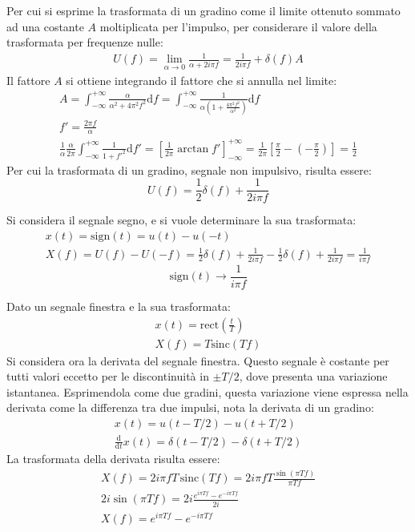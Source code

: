 \documentclass{article}
\newcommand{\rect}{\mathrm{rect}}
\newcommand{\sinc}{\mathrm{sinc}}
\newcommand{\df}{\mathrm{d}}
\numberwithin{equation}{subsection}
\begin{document}
Per cui si esprime la trasformata di un gradino come il limite ottenuto sommato ad una costante $A$ moltiplicata per l'impulso, per considerare il valore della trasformata 
per frequenze nulle: 
\begin{gather*}
    U(f)=\displaystyle\lim_{\alpha\to0}\frac{1}{\alpha+2i\pi f}=\frac{1}{2i\pi f}+\delta(f)A
\end{gather*}
Il fattore $A$ si ottiene integrando il fattore che si annulla nel limite:
\begin{gather*}
    A=\displaystyle\int_{-\infty}^{+\infty}\frac{\alpha}{\alpha^2+4\pi^2f^2}\df f=\int_{-\infty}^{+\infty}\frac{1}{\alpha\left(1+\frac{4\pi^2f^2}{\alpha^2}\right)}\df f\\
    f'=\displaystyle\frac{2\pi f}{\alpha}\\
    \displaystyle\frac{1}{\alpha}\frac{\alpha}{2\pi}\int_{-\infty}^{+\infty}\frac{1}{1+f'^2}\df f'=\left[\frac{1}{2\pi}\arctan f'\right]^{+\infty}_{-\infty}=\frac{1}{2\pi}\left[\frac{\pi}{2}-\left(-\frac{\pi}{2}\right)\right]=\frac{1}{2}
\end{gather*}
Per cui la trasformata di un gradino, segnale non impulsivo, risulta essere:
\begin{equation}
    U(f)=\displaystyle\frac{1}{2}\delta(f)+\frac{1}{2i\pi f}
\end{equation}


Si considera il segnale segno, e si vuole determinare la sua trasformata:
\begin{gather*}
    x(t)=\mathrm{sign}(t)=u(t)-u(-t)\\
    X(f)=U(f)-U(-f)=\displaystyle\frac{1}{2}\delta(f)+\frac{1}{2i\pi f}-\frac{1}{2}\delta(f)+\frac{1}{2i\pi f}=\frac{1}{i\pi f}
\end{gather*}
\begin{equation}
    \mathrm{sign}(t)\to\displaystyle\frac{1}{i\pi f}
\end{equation}


Dato un segnale finestra e la sua trasformata:
\begin{gather*}
    x(t)=\rect\displaystyle\left(\frac{t}{T}\right)\\
    X(f)=T\sinc\displaystyle\left(Tf\right)
\end{gather*}
Si considera ora la derivata del segnale finestra. Questo segnale è costante per tutti valori eccetto per le discontinuità in $\pm T/2$, dove presenta una variazione istantanea. 
Esprimendola come due gradini, questa variazione viene espressa nella derivata come la differenza tra due impulsi, nota la derivata di un gradino: 
\begin{gather*}
    x(t)=u(t-T/2)-u(t+T/2)\\
    \displaystyle\frac{\df}{\df t}x(t)=\delta(t-T/2)-\delta(t+T/2)
\end{gather*}
La trasformata della derivata risulta essere:
\begin{gather*}
    X(f)=2i\pi fT\,\sinc(Tf)=\displaystyle2i\pi fT\frac{\sin(\pi Tf)}{\pi Tf}\\
    2i\sin(\pi Tf)=2i\frac{e^{i\pi Tf}-e^{-i\pi Tf}}{2i}\\
    X(f)=e^{i\pi Tf}-e^{-i\pi Tf}
\end{gather*}
\end{document}
